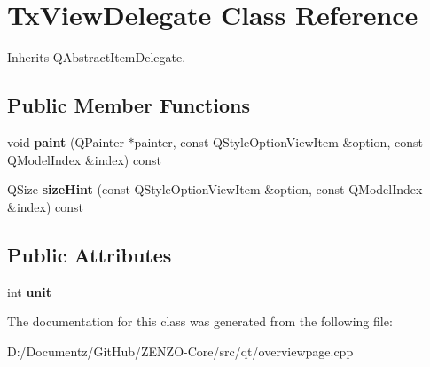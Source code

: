 \hypertarget{class_tx_view_delegate}{}\section{Tx\+View\+Delegate Class Reference}
\label{class_tx_view_delegate}


Inherits Q\+Abstract\+Item\+Delegate.

\subsection*{Public Member Functions}
\begin{DoxyCompactItemize}
\item 
\mbox{\label{class_tx_view_delegate_aeb314283e3a3fae5099d95c7b3309d57}} 
void {\bfseries paint} (Q\+Painter $\ast$painter, const Q\+Style\+Option\+View\+Item \&option, const Q\+Model\+Index \&index) const
\item 
\mbox{\label{class_tx_view_delegate_aff22f5cc2236638043688dbc1644c44e}} 
Q\+Size {\bfseries size\+Hint} (const Q\+Style\+Option\+View\+Item \&option, const Q\+Model\+Index \&index) const
\end{DoxyCompactItemize}
\subsection*{Public Attributes}
\begin{DoxyCompactItemize}
\item 
\mbox{\label{class_tx_view_delegate_a4281e394dd7e90ecd8401fdca7b0413a}} 
int {\bfseries unit}
\end{DoxyCompactItemize}


The documentation for this class was generated from the following file\+:\begin{DoxyCompactItemize}
\item 
D\+:/\+Documentz/\+Git\+Hub/\+Z\+E\+N\+Z\+O-\/\+Core/src/qt/overviewpage.\+cpp\end{DoxyCompactItemize}
